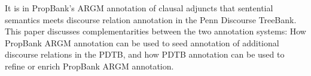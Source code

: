 It is in PropBank's ARGM annotation of clausal adjuncts that sentential semantics meets discourse relation annotation in the Penn Discourse TreeBank. This paper discusses complementarities between the two annotation systems: How PropBank ARGM annotation can be used to seed annotation of additional discourse relations in the PDTB, and how PDTB annotation can be used to refine or enrich PropBank ARGM annotation.
